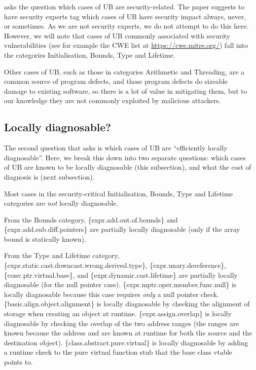 \cite{P3656R1} asks the question which cases of UB are security-related. The paper suggests to have security experts tag which cases of UB have security impact always, never, or sometimes. As we are not security experts, we do not attempt to do this here. However, we will note that cases of UB commonly associated with security vulnerabilities (see for example the CWE list at \url{https://cwe.mitre.org/}) fall into the categories Initialisation, Bounds, Type and Lifetime. 

Other cases of UB, such as those in categories Arithmetic and Threading, are a common source of program defects, and those program defects do sizeable damage to existing software, so there is a lot of value in mitigating them, but to our knowledge they are not commonly exploited by malicious attackers.

\subsection{Locally diagnosable?}
\label{locally}

The second question that \cite{P3656R1} asks is which cases of UB are ``efficiently locally diagnosable''. Here, we break this down into two separate questions: which cases of UB are known to be locally diagnosable (this subsection), and what the cost of diagnosis is (next subsection).

Most cases in the security-critical Initialisation, Bounds, Type and Lifetime categories are \emph{not} locally diagnosable. 

From the Bounds category, 
\{expr.add.out.of.bounds\} 
and \{expr.add.sub.diff.pointers\} 
are partially locally diagnosable (only if the array bound is statically known).

From the Type and Lifetime category,
\{expr.static.cast.downcast.wrong.derived.type\},
\{expr.unary.dereference\},
\{conv.ptr.virtual.base\}, and
\{expr.dynamic.cast.lifetime\}
are partially locally diagnosable (for the null pointer case).
\{expr.mptr.oper.member.func.null\} is locally diagnosable because this case requires \emph{only} a null pointer check.
\{basic.align.object.alignment\} is locally diagnosable by checking the alignment of storage when creating an object at runtime.
\{expr.assign.overlap\} is locally diagnosable by checking the overlap of the two address ranges (the ranges are known because the address and  are known at runtime for both the source and the destination object). \{class.abstract.pure.virtual\} is locally diagnosable by adding a runtime check to  the pure virtual function stub that the base class vtable points to.

